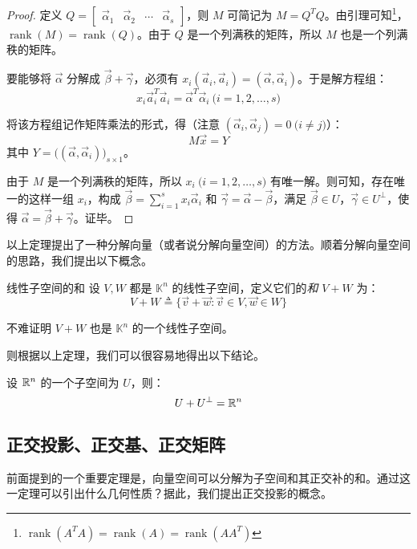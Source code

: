 \begin{proof}
	定义 $Q = \begin{bmatrix} \vec \alpha_1 & \vec \alpha_2 & \cdots & \vec \alpha_s \end{bmatrix}$，则 $M$ 可简记为 $M = Q^T Q$。由引理可知\footnote{$\operatorname{rank}(A^T A) = \operatorname{rank}(A) = \operatorname{rank}(AA^T)$}，$\operatorname{rank}(M) = \operatorname{rank}(Q)$。由于 $Q$ 是一个列满秩的矩阵，所以 $M$ 也是一个列满秩的矩阵。

	\bigskip

	要能够将 $\vec \alpha$ 分解成 $\vec \beta + \vec \gamma$，必须有 $x_i (\vec a_i, \vec a_i) = (\vec \alpha, \vec \alpha_i)$。于是解方程组：
	$$
	x_i \vec a_i^T \vec a_i = \vec \alpha^T \vec \alpha_i \pod{i = 1, 2, \ldots, s}
	$$

	将该方程组记作矩阵乘法的形式，得（注意 $(\vec \alpha_i, \vec \alpha_j) = 0 \pod{i \ne j}$）：
	$$
	M \vec x = Y
	$$
	其中 $Y = \bigl( (\vec \alpha, \vec \alpha_i) \bigr)_{s \times 1}$。

	由于 $M$ 是一个列满秩的矩阵，所以 $x_i \pod{i = 1, 2, \ldots, s}$ 有唯一解。则可知，存在唯一的这样一组 $x_i$，构成 $\vec \beta = \sum\limits_{i = 1}^s x_i \vec \alpha_i$ 和 $\vec \gamma = \vec \alpha - \vec \beta$，满足 $\vec \beta \in U$，$\vec \gamma \in U^\perp$，使得 $\vec \alpha = \vec \beta + \vec \gamma$。证毕。

\end{proof}

以上定理提出了一种分解向量（或者说分解向量空间）的方法。顺着分解向量空间的思路，我们提出以下概念。

\begin{definition}{线性子空间的和}
	设 $V, W$ 都是 $\mathbb K^n$ 的线性子空间，定义它们的\emph{和} $V + W$ 为：
	$$
	V + W \triangleq \{\vec v + \vec w \colon \vec v \in V, \vec w \in W\}
	$$

	不难证明 $V + W$ 也是 $\mathbb K^n$ 的一个线性子空间。
\end{definition}

则根据以上定理，我们可以很容易地得出以下结论。

\begin{theorem}
	设 $\mathbb R^n$ 的一个子空间为 $U$，则：
	$$
	U + U^\perp = \mathbb R^n
	$$
\end{theorem}

\subsection{正交投影、正交基、正交矩阵}

前面提到的一个重要定理是，向量空间可以分解为子空间和其正交补的和。通过这一定理可以引出什么几何性质？据此，我们提出正交投影的概念。

